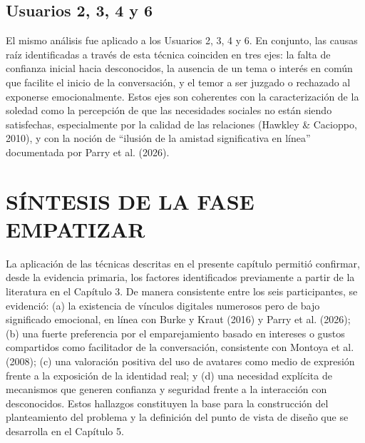 \subsection{Usuarios 2, 3, 4 y 6}
El mismo análisis fue aplicado a los Usuarios 2, 3, 4 y 6. En conjunto, las causas raíz identificadas a través de esta técnica coinciden en tres ejes: la falta de confianza inicial hacia desconocidos, la ausencia de un tema o interés en común que facilite el inicio de la conversación, y el temor a ser juzgado o rechazado al exponerse emocionalmente. Estos ejes son coherentes con la caracterización de la soledad como la percepción de que las necesidades sociales no están siendo satisfechas, especialmente por la calidad de las relaciones (Hawkley \& Cacioppo, 2010), y con la noción de ``ilusión de la amistad significativa en línea'' documentada por Parry et al. (2026).

\section{SÍNTESIS DE LA FASE EMPATIZAR}
La aplicación de las técnicas descritas en el presente capítulo permitió confirmar, desde la evidencia primaria, los factores identificados previamente a partir de la literatura en el Capítulo 3. De manera consistente entre los seis participantes, se evidenció: (a) la existencia de vínculos digitales numerosos pero de bajo significado emocional, en línea con Burke y Kraut (2016) y Parry et al. (2026); (b) una fuerte preferencia por el emparejamiento basado en intereses o gustos compartidos como facilitador de la conversación, consistente con Montoya et al. (2008); (c) una valoración positiva del uso de avatares como medio de expresión frente a la exposición de la identidad real; y (d) una necesidad explícita de mecanismos que generen confianza y seguridad frente a la interacción con desconocidos. Estos hallazgos constituyen la base para la construcción del planteamiento del problema y la definición del punto de vista de diseño que se desarrolla en el Capítulo 5.